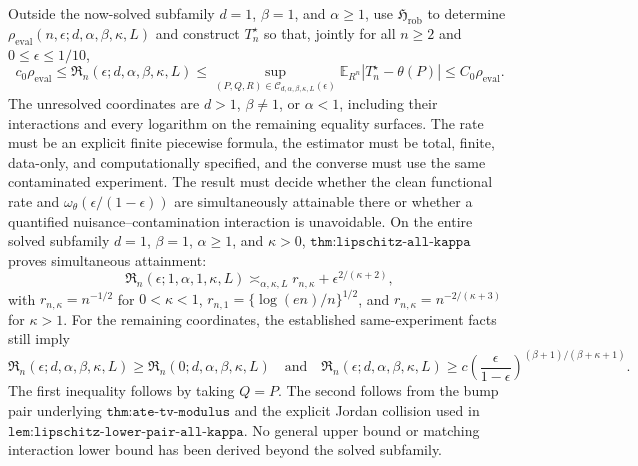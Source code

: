 Outside the now-solved subfamily \(d=1\), \(\beta=1\), and \(\alpha\geq1\), use \(\mathfrak H_{\mathrm{rob}}\) to determine \(\rho_{\mathrm{eval}}(n,\epsilon;d,\alpha,\beta,\kappa,L)\) and construct \(T_n^\star\) so that, jointly for all \(n\geq2\) and \(0\leq\epsilon\leq1/10\),
\[
c_0\rho_{\mathrm{eval}}
\leq\mathfrak R_n(\epsilon;d,\alpha,\beta,\kappa,L)
\leq\sup_{(P,Q,R)\in\mathcal C_{d,\alpha,\beta,\kappa,L}(\epsilon)}
\mathbb E_{R^n}|T_n^\star-\theta(P)|
\leq C_0\rho_{\mathrm{eval}}.
\]
The unresolved coordinates are \(d>1\), \(\beta\neq1\), or \(\alpha<1\), including their interactions and every logarithm on the remaining equality surfaces. The rate must be an explicit finite piecewise formula, the estimator must be total, finite, data-only, and computationally specified, and the converse must use the same contaminated experiment. The result must decide whether the clean functional rate and \(\omega_\theta(\epsilon/(1-\epsilon))\) are simultaneously attainable there or whether a quantified nuisance--contamination interaction is unavoidable.
On the entire solved subfamily \(d=1\), \(\beta=1\), \(\alpha\geq1\), and \(\kappa>0\), \(\texttt{thm:lipschitz-all-kappa}\) proves simultaneous attainment:
\[
\mathfrak R_n(\epsilon;1,\alpha,1,\kappa,L)
\asymp_{\alpha,\kappa,L}
r_{n,\kappa}+\epsilon^{2/(\kappa+2)},
\]
with \(r_{n,\kappa}=n^{-1/2}\) for \(0<\kappa<1\), \(r_{n,1}=\{\log(en)/n\}^{1/2}\), and \(r_{n,\kappa}=n^{-2/(\kappa+3)}\) for \(\kappa>1\). For the remaining coordinates, the established same-experiment facts still imply
\[
\mathfrak R_n(\epsilon;d,\alpha,\beta,\kappa,L)
\geq\mathfrak R_n(0;d,\alpha,\beta,\kappa,L)
\quad\text{and}\quad
\mathfrak R_n(\epsilon;d,\alpha,\beta,\kappa,L)
\geq c\left(\frac{\epsilon}{1-\epsilon}\right)^{(\beta+1)/(\beta+\kappa+1)}.
\]
The first inequality follows by taking \(Q=P\). The second follows from the bump pair underlying \(\texttt{thm:ate-tv-modulus}\) and the explicit Jordan collision used in \(\texttt{lem:lipschitz-lower-pair-all-kappa}\). No general upper bound or matching interaction lower bound has been derived beyond the solved subfamily.
